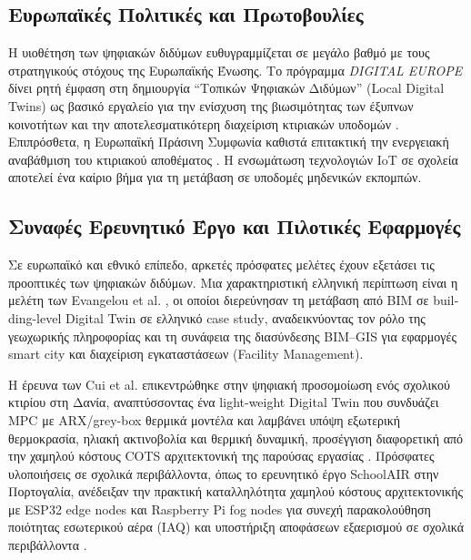 \subsection{Ευρωπαϊκές Πολιτικές και Πρωτοβουλίες}
Η υιοθέτηση των ψηφιακών διδύμων ευθυγραμμίζεται σε μεγάλο βαθμό με τους στρατηγικούς στόχους της Ευρωπαϊκής Ένωσης. Το πρόγραμμα \textit{\textlatin{DIGITAL EUROPE}} δίνει ρητή έμφαση στη δημιουργία ``Τοπικών Ψηφιακών Διδύμων'' (\textlatin{Local Digital Twins}) ως βασικό εργαλείο για την ενίσχυση της βιωσιμότητας των έξυπνων κοινοτήτων και την αποτελεσματικότερη διαχείριση κτιριακών υποδομών \cite{EuropeanCommission2023}. Επιπρόσθετα, η Ευρωπαϊκή Πράσινη Συμφωνία καθιστά επιτακτική την ενεργειακή αναβάθμιση του κτιριακού αποθέματος \cite{EUParliament2024}. Η ενσωμάτωση τεχνολογιών \textlatin{IoT} σε σχολεία αποτελεί ένα καίριο βήμα για τη μετάβαση σε υποδομές μηδενικών εκπομπών.

\subsection{Συναφές Ερευνητικό Έργο και Πιλοτικές Εφαρμογές}
Σε ευρωπαϊκό και εθνικό επίπεδο, αρκετές πρόσφατες μελέτες έχουν εξετάσει τις προοπτικές των ψηφιακών διδύμων. Μια χαρακτηριστική ελληνική περίπτωση είναι η μελέτη των \textlatin{Evangelou et al.} \cite{Evangelou2022}, οι οποίοι διερεύνησαν τη μετάβαση από \textlatin{BIM} σε \textlatin{building-level Digital Twin} σε ελληνικό \textlatin{case study}, αναδεικνύοντας τον ρόλο της γεωχωρικής πληροφορίας και τη συνάφεια της διασύνδεσης \textlatin{BIM--GIS} για εφαρμογές \textlatin{smart city} και διαχείριση εγκαταστάσεων (\textlatin{Facility Management}).

Η έρευνα των \textlatin{Cui et al.} επικεντρώθηκε στην ψηφιακή προσομοίωση ενός σχολικού κτιρίου στη Δανία, αναπτύσσοντας ένα \textlatin{light-weight Digital Twin} που συνδυάζει \textlatin{MPC} με \textlatin{ARX/grey-box} θερμικά μοντέλα και λαμβάνει υπόψη εξωτερική θερμοκρασία, ηλιακή ακτινοβολία και θερμική δυναμική, προσέγγιση διαφορετική από την χαμηλού κόστους \textlatin{COTS} αρχιτεκτονική της παρούσας εργασίας \cite{Cui2023}. Πρόσφατες υλοποιήσεις σε σχολικά περιβάλλοντα, όπως το ερευνητικό έργο \textlatin{SchoolAIR} στην Πορτογαλία, ανέδειξαν την πρακτική καταλληλότητα χαμηλού κόστους αρχιτεκτονικής με \textlatin{ESP32 edge nodes} και \textlatin{Raspberry Pi fog nodes} για συνεχή παρακολούθηση ποιότητας εσωτερικού αέρα (\textlatin{IAQ}) και υποστήριξη αποφάσεων εξαερισμού σε σχολικά περιβάλλοντα \cite{Barros2024}.


